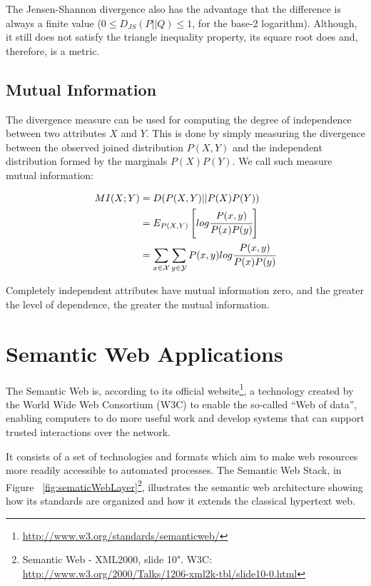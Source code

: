 The Jensen-Shannon divergence also has the advantage that the difference is always a finite value ($0 \leq
D_{JS}(P||Q) \leq 1$, for the base-2 logarithm). Although, it still does not satisfy the triangle inequality property,
its square root does and, therefore, is a metric.

\subsection{Mutual Information}

The divergence measure can be used for computing the degree of independence between two attributes $X$ and $Y$. This
is
done by simply measuring the divergence between the observed joined distribution $P(X,Y)$ and the independent
distribution formed by the marginals $P(X)P(Y)$. We call such measure mutual information:

\begin{equation} \label{eq:mutualInformation}
\begin{split}
 MI(X;Y)&=D(P(X,Y)||P(X)P(Y)) \\
 &=E_{P(X,Y)}\left[ log\cfrac{P(x,y)}{P(x)P(y)} \right] \\
 &=\sum_{x \in \mathcal{X}} \sum_{y \in \mathcal{Y}} P(x,y)log\cfrac{P(x,y)}{P(x)P(y)}
\end{split}
\end{equation}

Completely independent attributes have mutual information zero, and the greater the level of dependence, the greater
the mutual information.


\cite{DBLP:conf/sac/CaldersGPR09}
\cite{Vinh:2010:ITM:1953011.1953024}


\section{Semantic Web Applications}
\label{sec:rw-semanticWeb}

The Semantic Web is, according to its official website\footnote{\url{http://www.w3.org/standards/semanticweb/}}, a
technology created by the World Wide Web Consortium (W3C) to enable the so-called ``Web of data'', enabling computers
to do more useful work and develop systems that can support trusted interactions over the network. 

It consists of a set of technologies and formats which aim to make web resources more readily accessible to automated
processes. The Semantic Web Stack, in Figure ~\ref{fig:sematicWebLayer}\footnote{Semantic Web - XML2000, slide 10".
W3C: \url{http://www.w3.org/2000/Talks/1206-xml2k-tbl/slide10-0.html}}, illustrates the semantic web architecture
showing how its standards are organized and how it extends the classical hypertext web.

